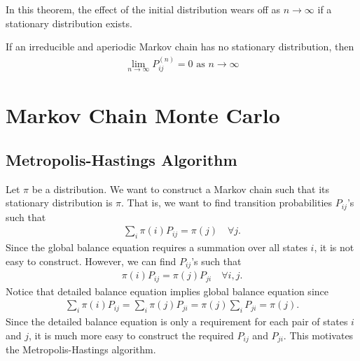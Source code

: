 \documentclass[a4paper,12pt]{article}
\begin{document}
\begin{remark}
	In this theorem,
	the effect of the initial distribution wears off as $n\to\infty$ if a stationary distribution exists.
\end{remark}

\begin{theorem}
	If an irreducible and aperiodic Markov chain has no stationary distribution, then
	\begin{align*}
		\lim_{n\to\infty} P_{ij}^{(n)} = 0 \text{ as } n\to\infty
	\end{align*}
\end{theorem}


\section{Markov Chain Monte Carlo}

\subsection{Metropolis-Hastings Algorithm}


Let $\pi$ be a distribution.
We want to construct a Markov chain such that its stationary distribution is $\pi$.
That is, we want to find transition probabilities $P_{ij}$'s such that
\begin{align*}
	\sum_{i} \pi(i) P_{ij} = \pi(j) \quad\forall j.
	\tag{Global Balance Equation}
\end{align*}
Since the global balance equation requires a summation over all states $i$,
it is not easy to construct.
However, we can find $P_{ij}$'s such that
\begin{align*}
	\pi(i)P_{ij} = \pi(j)P_{ji} \quad\forall i,j.
	\tag{Detailed Balance Equation}
\end{align*}
Notice that detailed balance equation implies global balance equation since
\begin{align*}
	\sum_{i} \pi(i)P_{ij}
	= \sum_{i} \pi(j)P_{ji}
	= \pi(j) \sum_{i} P_{ji}
	= \pi(j).
\end{align*}
Since the detailed balance equation is only a requirement for each pair of states $i$ and $j$,
it is much more easy to construct the required $P_{ij}$ and $P_{ji}$.
This motivates the Metropolis-Hastings algorithm.
\end{document}
